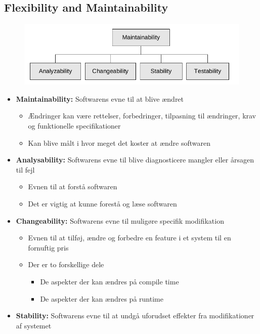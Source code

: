 \documentclass[a4, english]{article}
\begin{document}
\subsection{Flexibility and Maintainability}
\begin{figure}[H]
	\centering
	\includegraphics[width=\linewidth]{img/maintain}
\end{figure}
\begin{itemize}
	\item \textbf{Maintainability:} Softwarens evne til at blive ændret
  \begin{itemize}
  	\item Ændringer kan være rettelser, forbedringer, tilpasning til ændringer, krav og funktionelle specifikationer
    \item Kan blive målt i hvor meget det koster at ændre softwaren 
  \end{itemize} 
  \item \textbf{Analysability:} Softwarens evne til blive diagnosticere mangler eller årsagen til fejl
  \begin{itemize}
  	\item Evnen til at forstå softwaren
    \item Det er vigtig at kunne forestå og læse softwaren
  \end{itemize} 
  \item \textbf{Changeability:} Softwarens evne til muligøre specifik modifikation
  \begin{itemize}
  	\item Evnen til at tilføj, ændre og forbedre en feature i et system til en fornuftig pris
    \item Der er to forskellige dele 
    \begin{itemize}
    	\item De aspekter der kan ændres på compile time
      \item De aspekter der kan ændres på runtime
    \end{itemize}
  \end{itemize}
  \item \textbf{Stability:} Softwarens evne til at undgå uforudset effekter fra modifikationer af systemet

\end{itemize}
\end{document}
